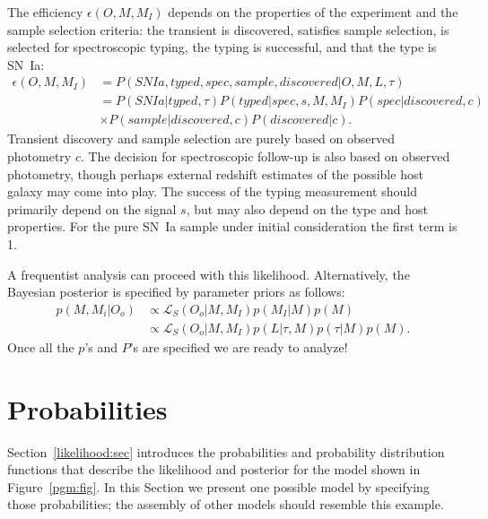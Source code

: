 \documentclass[preprint,3p]{elsarticle}
\begin{document}
The efficiency $\epsilon(O, M, M_I) $ depends on the properties of the experiment and the sample selection criteria:
the transient is discovered, satisfies sample selection, is selected for spectroscopic typing, the typing
is successful, and that the type is SN~Ia:
\begin{align*}
\epsilon(O, M, M_I)  & = P(SNIa, typed, spec, sample, discovered |O, M, L, \tau)\\
& = P(SNIa|  typed, \tau)P(typed | spec, s, M, M_I)P(spec | discovered, c) \\
& \times P(sample| discovered, c)P(discovered |c).
\end{align*}
Transient discovery and sample selection are purely based on observed photometry $c$.
The decision for spectroscopic follow-up is also based on observed photometry,  though perhaps external redshift estimates
of the possible host galaxy may come into play.  The success of the typing measurement should primarily depend
on the signal $s$, but may also depend on the type and host properties.  For the pure SN~Ia sample under initial consideration
the first term is 1.

A frequentist analysis can proceed with this likelihood.
Alternatively, the Bayesian posterior is specified by parameter priors as follows:
\begin{align*}
p(M, M_i | O_o) & \propto \mathcal{L}_S(O_o| M, M_I) p(M_I|M) p(M)\\
 & \propto \mathcal{L}_S(O_o| M, M_I) p(L| \tau, M) p(\tau|M) p(M).
\end{align*}
Once all the $p$'s and $P$'s are specified we are ready to analyze!

\section{Probabilities}
Section~\ref{likelihood:sec} introduces the probabilities and probability distribution functions that describe the likelihood
and posterior for the model shown in Figure~\ref{pgm:fig}.
In this Section we present one possible model by specifying those probabilities; the assembly of other models should
resemble this example.
\end{document}
